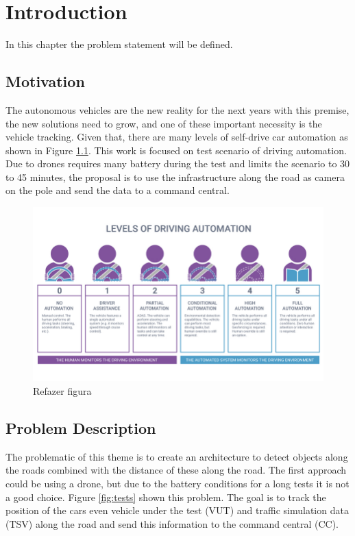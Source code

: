 \chapter{Introduction} \label{introducao}
In this chapter the problem statement will be defined. 
\section{Motivation}

The autonomous vehicles are the new reality for the next years with this premise, the new solutions need to grow, and one of these important necessity is the vehicle tracking. Given that, there are many levels of self-drive car automation as shown in Figure \ref{fig:automation}. This work is focused on test scenario of  driving automation. Due to drones requires many battery during the test and limits the scenario to 30 to 45 minutes, the proposal is to use the infrastructure along the road as camera on the pole and send the data to a command central.

\begin{figure}[H]
\centering
\includegraphics[scale=0.8]{imagens/automation.jpg}
\caption{Refazer figura}
\label{fig:automation}
\end{figure}

\section{Problem Description}

The problematic of this theme is to create an architecture to detect objects along the roads combined with the distance of these along the road. The first approach could be using a drone, but due to the battery conditions for a long tests it is not a good choice. Figure \ref{fig:tests} shown this problem. The goal is to track the position of the cars even vehicle under the test (VUT) and traffic simulation data (TSV) along the road and send this information to the command central (CC). 

